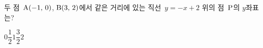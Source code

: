 두 점~$\mathrm{A}(-1,\,0)$, $\mathrm{B}(3,\,2)$에서 같은 거리에 있는 직선~$y=-x+2$ 위의 점~$\mathrm{P}$의 $y$좌표는?
\begin{choices32}{$0$}{$\dfrac{1}{2}$}{$1$}{$\dfrac{3}{2}$}{$2$}\end{choices32}
